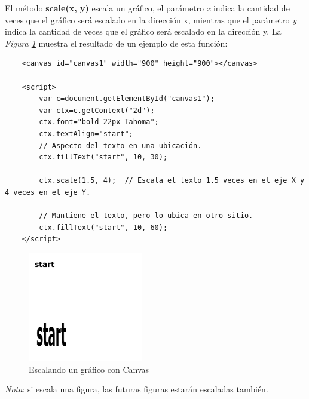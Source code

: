El método \textbf{scale(x, y)} escala un gráfico, el parámetro \textit{x} indica la cantidad de veces que el gráfico será escalado en la dirección x, mientras que el parámetro \textit{y} indica la cantidad de veces que el gráfico será escalado en la dirección y. La \textit{Figura \ref{fig: 30}} muestra el resultado de un ejemplo de esta función:
\begin{lstlisting}
    <canvas id="canvas1" width="900" height="900"></canvas> 
            
    <script>
        var c=document.getElementById("canvas1");
        var ctx=c.getContext("2d");
        ctx.font="bold 22px Tahoma";
        ctx.textAlign="start";
        // Aspecto del texto en una ubicación.
        ctx.fillText("start", 10, 30);
        
        ctx.scale(1.5, 4);  // Escala el texto 1.5 veces en el eje X y 4 veces en el eje Y.

        // Mantiene el texto, pero lo ubica en otro sitio.
        ctx.fillText("start", 10, 60);
    </script>
\end{lstlisting}
\begin{figure}[H]
    \centering
    \caption{Escalando un gráfico con Canvas}
    \label{fig: 30}
    \includegraphics[width=5cm]{ss_html/canvas_scale.png}
\end{figure}

\textit{Nota}: si escala una figura, las futuras figuras estarán escaladas también.


